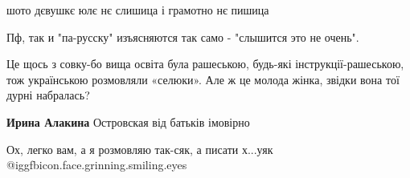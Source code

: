  
 
 
 
 

\begin{itemize}{

шото дєвушкє юлє нє слишица і грамотно нє пишица

 
Пф, так и "па-русску" изъясняются так само - "слышится это не очень".

 

Це щось з совку-бо вища освіта була рашеською, будь-які інструкції-рашеською, тож
українською розмовляли «селюки». Але ж це молода жінка, звідки вона тої дурні
набралась?

\begin{itemize}{
 
\textbf{Ирина Алакина} Островская від батьків імовірно
}\end{itemize}

 
Ох, легко вам, а я розмовляю так-сяк, а писати х...уяк @igg{fbicon.face.grinning.smiling.eyes} 

\begin{itemize}{
 
}
\end{itemize}}
\end{itemize}
